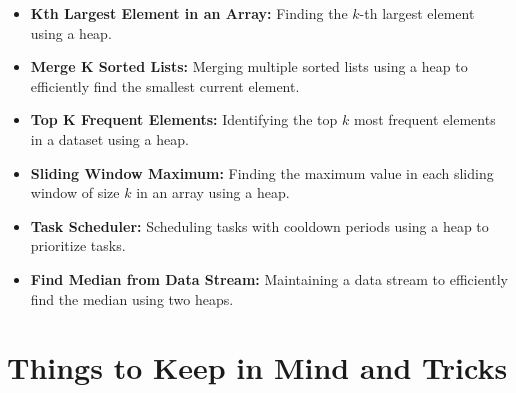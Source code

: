 \begin{itemize}
    \item \textbf{Kth Largest Element in an Array:} Finding the \( k \)-th largest element using a heap.
    
    \item \textbf{Merge K Sorted Lists:} Merging multiple sorted lists using a heap to efficiently find the smallest current element.
    
    \item \textbf{Top K Frequent Elements:} Identifying the top \( k \) most frequent elements in a dataset using a heap.
    
    \item \textbf{Sliding Window Maximum:} Finding the maximum value in each sliding window of size \( k \) in an array using a heap.
    
    \item \textbf{Task Scheduler:} Scheduling tasks with cooldown periods using a heap to prioritize tasks.
    
    \item \textbf{Find Median from Data Stream:} Maintaining a data stream to efficiently find the median using two heaps.
\end{itemize}

\section*{Things to Keep in Mind and Tricks}

